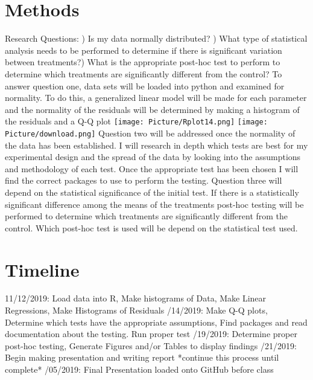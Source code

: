 \documentclass{article}
\begin{document}
\section{Methods}
Research Questions: ) Is my data normally distributed? ) What type of statistical analysis needs to be performed to determine if there is significant variation between treatments?) What is the appropriate post-hoc test to perform to determine which treatments are significantly different from the control? \newline
 \newline  
To answer question one, data sets will be loaded into python and examined for normality. To do this, a generalized linear model will be made for each parameter and the normality of the residuals will be determined by making a histogram of the residuals and a Q-Q plot
\newline
\texttt{[image: Picture/Rplot14.png]} 
\texttt{[image: Picture/download.png]} \newline  
\newline
Question two will be addressed once the normality of the data has been established. I will research in depth which tests are best for my experimental design and the spread of the data by looking into the assumptions and methodology of each test. Once the appropriate test has been chosen I will find the correct packages to use to perform the testing. 
Question three will depend on the statistical significance of the initial test. If there is a statistically significant difference among the means of the treatments post-hoc testing will be performed to determine which treatments are significantly different from the control. Which post-hoc test is used will be depend on the statistical test used.
\section{Timeline}

11/12/2019: Load data into R, Make histograms of Data, Make Linear Regressions, Make Histograms of Residuals
/14/2019: Make Q-Q plots, Determine which tests have the appropriate assumptions, Find packages and read documentation about the testing. Run proper test
/19/2019: Determine proper post-hoc testing, Generate Figures and/or Tables to display findings
/21/2019: Begin making presentation and writing report *continue this process until complete*
/05/2019: Final Presentation loaded onto GitHub before class
\end{document}
